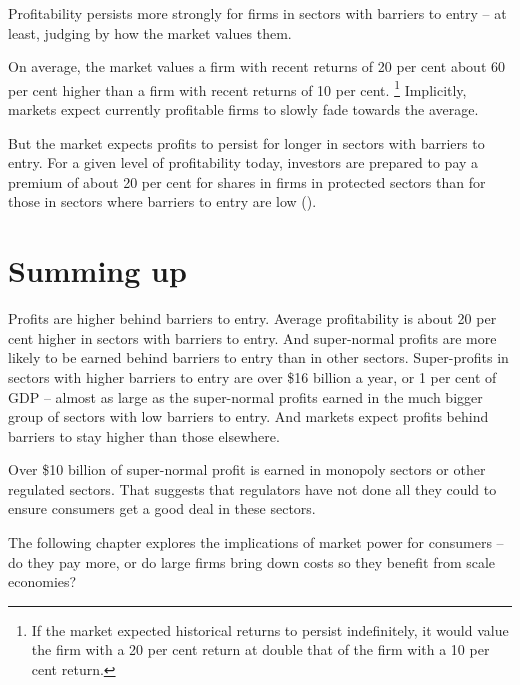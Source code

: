 Profitability persists more strongly for firms in sectors with barriers to entry -- at least, judging by how the market values them.

On average, the market values a firm with recent returns of 20 per cent about 60 per cent higher than a firm with recent returns of 10 per cent.%
    \footnote{If the market expected historical returns to persist indefinitely, it would value the firm with a 20 per cent return at double that of the firm with a 10 per cent return.}
Implicitly, markets expect currently profitable firms to slowly fade towards the average.

But the market expects profits to persist for longer in sectors with barriers to entry.
For a given level of profitability today, investors are prepared to pay a premium of about 20 per cent for shares in firms in protected sectors than for those in sectors where barriers to entry are low (). 

\section{Summing up}

Profits are higher behind barriers to entry. Average profitability is about 20 per cent higher in sectors with barriers to entry. And super-normal profits are more likely to be earned behind barriers to entry than in other sectors.
Super-profits in sectors with higher barriers to entry are over \$16 billion a year, or 1 per cent of GDP -- almost as large as the super-normal profits earned in the much bigger group of sectors with low barriers to entry. And markets expect profits behind barriers to stay higher than those elsewhere.

Over \$10 billion of super-normal profit is earned in monopoly sectors or other regulated sectors. That suggests that regulators have not done all they could to ensure consumers get a good deal in these sectors. 

The following chapter explores the implications of market power for consumers -- do they pay more, or do large firms bring down costs so they benefit from scale economies?
